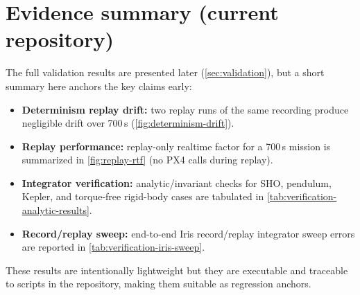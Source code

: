 \section{Evidence summary (current repository)}
\label{sec:evidence-summary}

The full validation results are presented later (\cref{sec:validation}), but a short summary here anchors the key claims early:
\begin{itemize}[leftmargin=*,itemsep=2pt]
  \item \textbf{Determinism replay drift:} two replay runs of the same recording produce negligible drift over 700\,s (\cref{fig:determinism-drift}).
  \item \textbf{Replay performance:} replay-only realtime factor for a 700\,s mission is summarized in \cref{fig:replay-rtf} (no PX4 calls during replay).
  \item \textbf{Integrator verification:} analytic/invariant checks for SHO, pendulum, Kepler, and torque-free rigid-body cases are tabulated in \cref{tab:verification-analytic-results}.
  \item \textbf{Record/replay sweep:} end-to-end Iris record/replay integrator sweep errors are reported in \cref{tab:verification-iris-sweep}.
\end{itemize}

These results are intentionally lightweight but they are executable and traceable to scripts in the repository, making them suitable as regression anchors.
